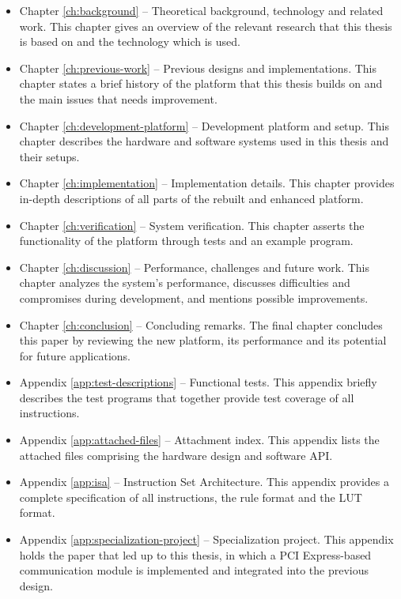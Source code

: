 \begin{itemize}
    \item Chapter \ref{ch:background} –
        Theoretical background, technology and related work.
        This chapter gives an overview of the relevant research that this thesis is based on and the technology which is used.
    \item Chapter \ref{ch:previous-work} –
        Previous designs and implementations.
        This chapter states a brief history of the platform that this thesis builds on and the main issues that needs improvement.
    \item Chapter \ref{ch:development-platform} –
        Development platform and setup.
        This chapter describes the hardware and software systems used in this thesis and their setups.
    \item Chapter \ref{ch:implementation} –
        Implementation details.
        This chapter provides in-depth descriptions of all parts of the rebuilt and enhanced platform.
    \item Chapter \ref{ch:verification} –
        System verification.
        This chapter asserts the functionality of the platform through tests and an example program.
    \item Chapter \ref{ch:discussion} –
        Performance, challenges and future work.
        This chapter analyzes the system's performance, discusses difficulties and compromises during development, and mentions possible improvements.
    \item Chapter \ref{ch:conclusion} –
        Concluding remarks.
        The final chapter concludes this paper by reviewing the new platform, its performance and its potential for future applications.
    \item Appendix \ref{app:test-descriptions} –
        Functional tests.
        This appendix briefly describes the test programs that together provide test coverage of all instructions.
    \item Appendix \ref{app:attached-files} –
        Attachment index.
        This appendix lists the attached files comprising the hardware design and software API.
    \item Appendix \ref{app:isa} –
        Instruction Set Architecture.
        This appendix provides a complete specification of all instructions, the rule format and the LUT format.
    \item Appendix \ref{app:specialization-project} –
        Specialization project.
        This appendix holds the paper that led up to this thesis, in which a PCI Express-based communication module is implemented and integrated into the previous design.
\end{itemize}

